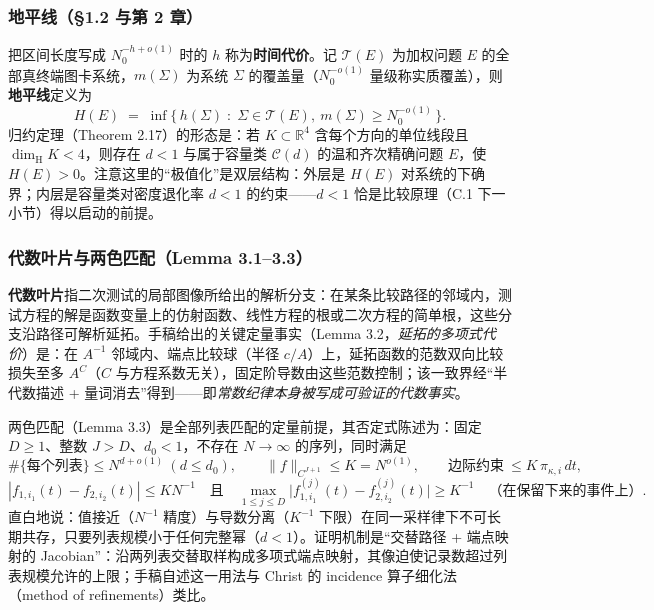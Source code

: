 \subsubsection*{地平线（§1.2 与第 2 章）}

把区间长度写成 $N_0^{-h+o(1)}$ 时的 $h$ 称为\textbf{时间代价}。记 $\mathcal{T}(E)$ 为加权问题 $E$ 的全部真终端图卡系统，$m(\Sigma)$ 为系统 $\Sigma$ 的覆盖量（$N_0^{-o(1)}$ 量级称实质覆盖），则\textbf{地平线}定义为
\begin{equation}
H(E)\;=\;\inf\bigl\{\,h(\Sigma)\;:\;\Sigma\in\mathcal{T}(E),\ m(\Sigma)\ge N_0^{-o(1)}\,\bigr\}.
\label{eq:horizon}
\end{equation}
归约定理（Theorem 2.17）的形态是：若 $K\subset\mathbb{R}^4$ 含每个方向的单位线段且 $\dim_{\mathrm{H}}K<4$，则存在 $d<1$ 与属于容量类 $\mathcal{C}(d)$ 的温和齐次精确问题 $E$，使 $H(E)>0$。注意这里的“极值化”是双层结构：外层是 $H(E)$ 对系统的下确界；内层是容量类对密度退化率 $d<1$ 的约束——$d<1$ 恰是比较原理（C.1 下一小节）得以启动的前提。

\subsubsection*{代数叶片与两色匹配（Lemma 3.1--3.3）}

\textbf{代数叶片}指二次测试的局部图像所给出的解析分支：在某条比较路径的邻域内，测试方程的解是函数变量上的仿射函数、线性方程的根或二次方程的简单根，这些分支沿路径可解析延拓。手稿给出的关键定量事实（Lemma 3.2，\emph{延拓的多项式代价}）是：在 $A^{-1}$ 邻域内、端点比较球（半径 $c/A$）上，延拓函数的范数双向比较损失至多 $A^{C}$（$C$ 与方程系数无关），固定阶导数由这些范数控制；该一致界经“半代数描述 + 量词消去”得到——即\emph{常数纪律本身被写成可验证的代数事实}。

两色匹配（Lemma 3.3）是全部列表匹配的定量前提，其否定式陈述为：固定 $D\ge1$、整数 $J>D$、$d_0<1$，不存在 $N\to\infty$ 的序列，同时满足
\begin{equation}
\#\{\text{每个列表}\}\le N^{d+o(1)}\ (d\le d_0),\qquad
\|f\|_{C^{J+1}}\le K=N^{o(1)},\qquad
\text{边际约束}\ \le K\,\pi_{\kappa,i}\,dt,
\end{equation}
\begin{equation}
|f_{1,i_1}(t)-f_{2,i_2}(t)|\le KN^{-1}
\quad\text{且}\quad
\max_{1\le j\le D}\bigl|f^{(j)}_{1,i_1}(t)-f^{(j)}_{2,i_2}(t)\bigr|\ge K^{-1}
\quad\text{（在保留下来的事件上）}.
\end{equation}
直白地说：值接近（$N^{-1}$ 精度）与导数分离（$K^{-1}$ 下限）在同一采样律下不可长期共存，只要列表规模小于任何完整幂（$d<1$）。证明机制是“交替路径 + 端点映射的 Jacobian”：沿两列表交替取样构成多项式端点映射，其像迫使记录数超过列表规模允许的上限；手稿自述这一用法与 Christ 的 incidence 算子细化法（method of refinements）类比。

